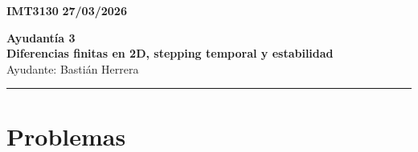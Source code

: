 \documentclass[11pt]{article}
\theoremstyle{thmstyle}
\begin{document}
    \begin{flushleft}
        \small
        \vspace{1pt}
        \textbf{IMT3130} \hfill
        \textbf{27/03/2026}
    \end{flushleft}
    \begin{center}
        \LARGE\textbf{Ayudant\'ia 3}\\
        \vspace{3pt}
        \normalsize\textbf{Diferencias finitas en 2D, stepping temporal y estabilidad}\\
        \normalsize Ayudante: Basti\'an Herrera 
        \rule{\textwidth}{0.05mm}
    \end{center}

\section{Problemas}
\end{document}
